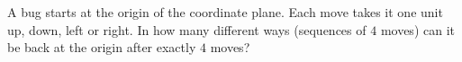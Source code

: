 A bug starts at the origin of the coordinate plane. Each move takes it one unit up, down, left or right. In how many different ways (sequences of $4$ moves) can it be back at the origin after exactly $4$ moves?

